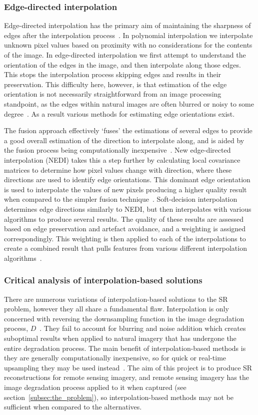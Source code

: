 \subsubsection{Edge-directed interpolation}
Edge-directed interpolation has the primary aim of maintaining the sharpness of edges after the interpolation process~\cite{interpolation}. In polynomial interpolation we interpolate unknown pixel values based on proximity with no considerations for the contents of the image. In edge-directed interpolation we first attempt to understand the orientation of the edges in the image, and then interpolate along those edges. This stops the interpolation process skipping edges and results in their preservation. This difficulty here, however, is that estimation of the edge orientation is not necessarily straightforward from an image processing standpoint, as the edges within natural images are often blurred or noisy to some degree~\cite{interpolation}. As a result various methods for estimating edge orientations exist.

The fusion approach effectively `fuses' the estimations of several edges to provide a good overall estimation of the direction to interpolate along, and is aided by the fusion process being computationally inexpensive~\cite{interpolation}. New edge-directed interpolation (NEDI) takes this a step further by calculating local covariance matrices to determine how pixel values change with direction, where these directions are used to identify edge orientations. This dominant edge orientation is used to interpolate the values of new pixels producing a higher quality result when compared to the simpler fusion technique~\cite{ref}. Soft-decision interpolation determines edge directions similarly to NEDI, but then interpolates with various algorithms to produce several results. The quality of these results are assessed based on edge preservation and artefact avoidance, and a weighting is assigned correspondingly. This weighting is then applied to each of the interpolations to create a combined result that pulls features from various different interpolation algorithms~\cite{ref}.

\subsubsection{Critical analysis of interpolation-based solutions}
There are numerous variations of interpolation-based solutions to the SR problem, however they all share a fundamental flaw. Interpolation is only concerned with reversing the downsampling function in the image degradation process, $D$~\cite{interpolation}. They fail to account for blurring and noise addition which creates suboptimal results when applied to natural imagery that has undergone the entire degradation process. The main benefit of interpolation-based methods is they are generally computationally inexpensive, so for quick or real-time upsampling they may be used instead~\cite{interpolation}. The aim of this project is to produce SR reconstructions for remote sensing imagery, and remote sensing imagery has the image degradation process applied to it when captured (see section~\ref{subsec:the_problem}), so interpolation-based methods may not be sufficient when compared to the alternatives.

